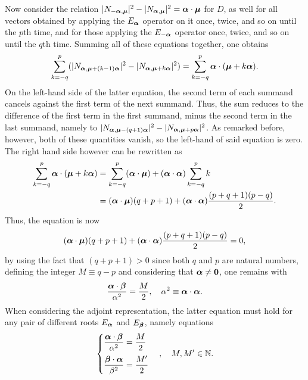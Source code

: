 Now consider the relation $|N_{-\bm{\alpha},\bm{\mu}}|^2 - |N_{\bm{\alpha},\bm{\mu}}|^2 = \bm{\alpha} \cdot \bm{\mu}$ for $D$, as well for all vectors obtained by applying the $E_{\bm{\alpha}}$ operator on it once, twice, and so on until the $p$th time, and for those applying the $E_{-\bm{\alpha}}$ operator once, twice, and so on until the $q$th time. Summing all of these equations together, one obtains
\begin{equation}
    \sum_{k=-q}^p(|N_{\bm{\alpha},\bm{\mu} + (k - 1)\bm{\alpha}}|^2 - |N_{\bm{\alpha},\bm{\mu} + k\bm{\alpha}}|^2) = \sum_{k=-q}^p\bm{\alpha} \cdot (\bm{\mu} + k\bm{\alpha}).
\end{equation}
On the left-hand side of the latter equation, the second term of each summand cancels against the first term of the next summand. Thus, the sum reduces to the difference of the first term in the first summand, minus the second term in the last summand, namely to $|N_{\bm{\alpha},\bm{\mu} - (q + 1)\bm{\alpha}}|^2 - |N_{\bm{\alpha},\bm{\mu} + p\bm{\alpha}}|^2$. As remarked before, however, both of these quantities vanish, so the left-hand of said equation is zero. The right hand side however can be rewritten as
\begin{equation}
    \begin{split}
        \sum_{k=-q}^p\bm{\alpha}\cdot(\bm{\mu} + k\bm{\alpha}) &= \sum_{k=-q}^p(\bm{\alpha}\cdot\bm{\mu}) + (\bm{\alpha} \cdot \bm{\alpha})\sum_{k=-q}^pk \\
        &= (\bm{\alpha} \cdot \bm{\mu})(q + p + 1) + (\bm{\alpha} \cdot \bm{\alpha})\frac{(p + q + 1)(p - q)}{2}.
    \end{split}
\end{equation}
Thus, the equation is now 
\begin{equation}
    (\bm{\alpha} \cdot \bm{\mu})(q + p + 1) + (\bm{\alpha} \cdot \bm{\alpha})\frac{(p + q + 1)(p - q)}{2} = 0,
\end{equation}
by using the fact that $(q + p + 1) > 0$ since both $q$ and $p$ are natural numbers, defining the integer $M \equiv q - p$ and considering that $\bm{\alpha} \neq \bm{0}$, one remains with
\begin{equation}
    \frac{\bm{\alpha} \cdot \bm{\beta}}{\alpha^2} = \frac{M}{2},\quad \alpha^2 \equiv  \bm{\alpha} \cdot \bm{\alpha}.
\end{equation}
When considering the adjoint representation, the latter equation must hold for any pair of different roots $E_{\bm{\alpha}}$ and $E_{\bm{\beta}}$, namely equations
\begin{equation}
    \begin{cases}
        \dfrac{\bm{\alpha} \cdot \bm{\beta}}{\alpha^2} = \dfrac{M}{2} \\[2ex]
        \dfrac{\bm{\beta} \cdot \bm{\alpha}}{\beta^2} = \dfrac{M'}{2}
    \end{cases},\quad M,M' \in \mathbb{N}.
\end{equation}
